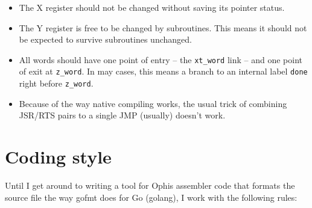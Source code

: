 \begin{itemize}

        \item The X register should not be changed without saving its pointer
                status.

        \item The Y register is free to be changed by subroutines. This means it
                should not be expected to survive subroutines unchanged.

        \item All words should have one point of entry -- the \texttt{xt\_word}
                link -- and one point of exit at \texttt{z\_word}. In may cases,
                this means a branch to an internal label \texttt{done} right
                before \texttt{z\_word}.

        \item Because of the way native compiling works, the usual trick of
                combining JSR/RTS pairs to a single JMP (usually) doesn't work.

\end{itemize}


\section{Coding style}

Until I get around to writing a tool for Ophis assembler code that formats the
source file the way gofmt does for Go (golang), I work with the following
rules:

